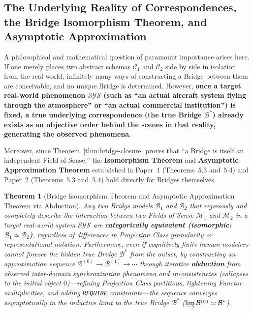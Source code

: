 \documentclass[11pt,a4paper]{article}
\theoremstyle{definition}
\theoremstyle{plain}
\newtheorem{theorem}{Theorem}[section]
\theoremstyle{remark}
\begin{document}
\subsection{The Underlying Reality of Correspondences, the Bridge Isomorphism Theorem, and Asymptotic Approximation}
A philosophical and mathematical question of paramount importance arises here. If one merely places two abstract schemas $\mathcal{C}_1$ and $\mathcal{C}_2$ side by side in isolation from the real world, infinitely many ways of constructing a Bridge between them are conceivable, and no unique Bridge is determined. However, \textbf{once a target real-world phenomenon $\mathcal{SYS}$ (such as ``an actual aircraft system flying through the atmosphere'' or ``an actual commercial institution'') is fixed, a true underlying correspondence (the true Bridge $\mathcal{B}^*$) already exists as an objective order behind the scenes in that reality, generating the observed phenomena}.

Moreover, since Theorem~\ref{thm:bridge-closure} proves that ``a Bridge is itself an independent Field of Sense,'' the \textbf{Isomorphism Theorem} and \textbf{Asymptotic Approximation Theorem} established in Paper~1 (Theorems~5.3 and~5.4) and Paper~2 (Theorems~5.3 and~5.4) hold directly for Bridges themselves.

\begin{theorem}[Bridge Isomorphism Theorem and Asymptotic Approximation Theorem via Abduction]\label{thm:bridge-iso-asymp}
Any two Bridge models $\mathcal{B}_1$ and $\mathcal{B}_2$ that rigorously and completely describe the interaction between two Fields of Sense $\mathcal{M}_1$ and $\mathcal{M}_2$ in a target real-world system $\mathcal{SYS}$ are \textbf{categorically equivalent (isomorphic: $\mathcal{B}_1 \simeq \mathcal{B}_2$)}, regardless of differences in Projection Class granularity or representational notation. Furthermore, even if cognitively finite human modelers cannot foresee the hidden true Bridge $\mathcal{B}^*$ from the outset, by constructing an approximation sequence $\mathcal{B}^{(0)} \to \mathcal{B}^{(1)} \to \cdots$ through iterative \textbf{abduction} from observed inter-domain synchronization phenomena and inconsistencies (collapses to the initial object $0$)---refining Projection Class partitions, tightening Functor multiplicities, and adding \texttt{REQUIRE} constraints---the sequence converges asymptotically in the inductive limit to the true Bridge $\mathcal{B}^*$ ($\varinjlim \mathcal{B}^{(n)} \simeq \mathcal{B}^*$).
\end{theorem}
\end{document}
